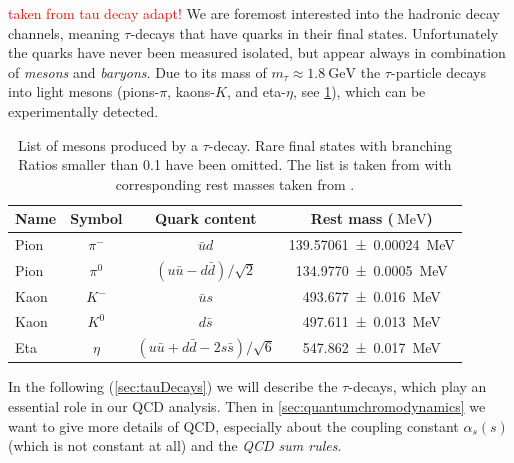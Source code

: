 \documentclass[../../index.tex]{subfiles}
\begin{document}
\textcolor{red}{taken from tau decay adapt!}
We are foremost interested into the hadronic decay channels, meaning
$\tau$-decays that have quarks in their final states. Unfortunately the quarks
have never been measured isolated, but appear always in combination of \textit{mesons}
and \textit{baryons}. Due to its mass of $m_\tau \approx
\SI{1.8}{\giga\electronvolt}$ the $\tau$-particle decays into light mesons
(pions-$\pi$, kaons-$K$, and eta-$\eta$, see \cref{table:lightMesons}), which
can be experimentally detected.
\begin{table}
  \centering
  \begin{tabular}{l c c c}
    \toprule
    Name & Symbol & Quark content & Rest mass ($\SI{}{\mega\electronvolt}$) \\
    \midrule
    Pion & $\pi^-$ & $\bar u d$ & \SI{139.57061 \pm 0.00024}{\mega\electronvolt}  \\
    Pion & $\pi^0$ & $(u \bar u - d \bar d)/\sqrt{2}$ & \SI{134.9770\pm0.0005}{\mega\electronvolt} \\
    Kaon & $K^-$ & $\bar u s$ & \SI{493.677\pm0.016}{\mega\electronvolt} \\
    Kaon & $K^0$ & $d \bar s$ & \SI{497.611\pm0.013}{\mega\electronvolt} \\
    Eta & $\eta$ & $(u \bar u + d \bar d - 2 s \bar s)/\sqrt{6}$ & \SI{547.862\pm0.017}{\mega\electronvolt} \\
  \end{tabular}
  \caption{List of mesons produced by a $\tau$-decay. Rare final states with
    branching Ratios smaller than 0.1 have been omitted. The list is taken from 
    \cite{Davier2006} with corresponding rest masses taken from \cite{PDG2018}.}
  \label{table:lightMesons}
\end{table}

In the following (\cref{sec:tauDecays}) we will describe the $\tau$-decays, which
play an essential role in our QCD analysis. Then in \cref{sec:quantumchromodynamics} we want to give more
details of QCD, especially about the coupling constant $\alpha_s(s)$ (which is not
constant at all) and the \textit{QCD sum rules}.
\end{document}
